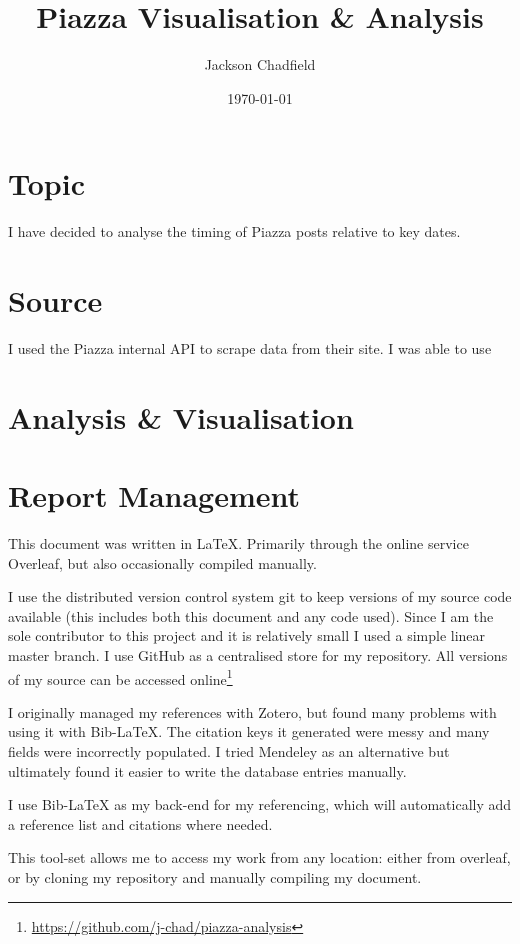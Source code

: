 \documentclass{scrartcl}
\title{Piazza Visualisation \& Analysis}
\author{Jackson Chadfield}
\date{\today}
\begin{document}
\maketitle

\section{Topic}
I have decided to analyse the timing of Piazza posts relative to key dates.

\section{Source}
I used the Piazza internal API to scrape data from their site. I was able to use \cite{piazza-api}

\section{Analysis \& Visualisation}

\section{Report Management}
This document was written in \LaTeX. Primarily through the online service Overleaf, but also occasionally compiled manually.

I use the distributed version control system git to keep versions of my source code available (this includes both this document and any code used). Since I am the sole contributor to this project and it is relatively small I used a simple linear master branch. I use GitHub as a centralised store for my repository. All versions of my source can be accessed online\footnote{\url{https://github.com/j-chad/piazza-analysis}}

I originally managed my references with Zotero, but found many problems with using it with Bib-\LaTeX{}. The citation keys it generated were messy and many fields were incorrectly populated. I tried Mendeley as an alternative but ultimately found it easier to write the database entries manually.

I use Bib-\LaTeX{} as my back-end for my referencing, which will automatically add a reference list and citations where needed.

This tool-set allows me to access my work from any location: either from overleaf, or by cloning my repository and manually compiling my document.

\printbibliography
\end{document}
